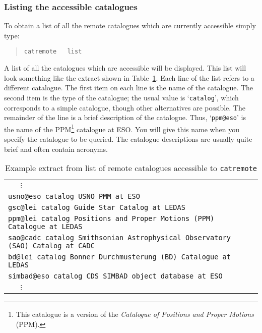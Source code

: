 \documentclass[twoside,11pt]{article}
\renewcommand{\_}{\texttt{\symbol{95}}}
\begin{document}
\subsubsection{Listing the accessible catalogues  \label{REMLISTS} }

To obtain a list of all the remote catalogues which are currently
accessible simply type:

\begin{verse}
{\tt catremote ~ list}
\end{verse}

A list of all the catalogues which are accessible will be displayed.  This
list will look something like the extract shown in Table~\ref{REMLIST}.
Each line of the list refers to a different catalogue.  The first item
on each line is the name of the catalogue.  The second item is the type
of the catalogue; the usual value is `{\tt catalog}', which corresponds
to a simple catalogue, though other alternatives are possible.
The remainder of the line is a brief description of the catalogue.  Thus,
`{\tt ppm@eso}' is the name of the PPM\footnote{This catalogue is a version
of the {\it Catalogue of Positions and Proper Motions}\,
(PPM)\cite{PPMN,PPMS}.}
catalogue at ESO.  You will give this name  when you specify the catalogue
to be queried.  The catalogue descriptions are usually quite
brief and often contain acronyms.

\begin{table}[htbp]

\begin{center}
\begin{tabular}{l}
{\tt ~~~$\vdots$ } \\
{\tt usno@eso  catalog  USNO PMM at ESO} \\
{\tt gsc@lei  catalog  Guide Star Catalog at LEDAS} \\
{\tt ppm@lei  catalog  Positions and Proper Motions (PPM) Catalogue at LEDAS} \\
{\tt sao@cadc  catalog  Smithsonian Astrophysical Observatory (SAO) Catalog at CADC} \\
{\tt bd@lei  catalog  Bonner Durchmusterung (BD) Catalogue at LEDAS} \\
{\tt simbad@eso  catalog  CDS SIMBAD object database at ESO} \\
{\tt ~~~$\vdots$ } \\
\end{tabular}
\end{center}

\begin{quote}
\caption{Example extract from list of remote catalogues accessible to
{\tt catremote} \label{REMLIST} }
\end{quote}

\end{table}
\end{document}
